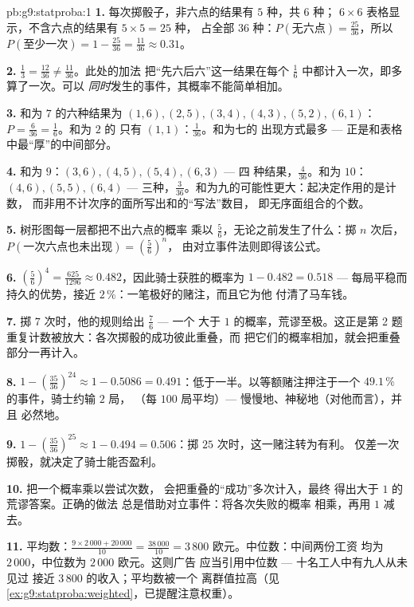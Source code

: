 \begin{solution}{pb:g9:statproba:1}
\textbf{1.} 每次掷骰子，非六点的结果有 $5$ 种，共 $6$ 种；
$6 \times 6$ 表格显示，不含六点的结果有 $5 \times 5 = 25$ 种，
占全部 $36$ 种：$P(\text{无六点}) = \frac{25}{36}$，所以
$P(\text{至少一次}) = 1 - \frac{25}{36} = \frac{11}{36}
\approx 0.31$。

\textbf{2.} $\frac13 = \frac{12}{36} \neq \frac{11}{36}$。此处的加法
把“先六后六”这一结果在每个
$\frac16$ 中都计入一次，即多算了一次。可以
\emph{同时}发生的事件，其概率不能简单相加。

\textbf{3.} 和为 $7$ 的六种结果为 $(1,6), (2,5), (3,4),
(4,3), (5,2), (6,1)$：$P = \frac{6}{36} = \frac16$。和为 $2$ 的
只有 $(1,1)$：$\frac{1}{36}$。和为七的
出现方式最多 --- 正是和表格中最“厚”的中间部分。

\textbf{4.} 和为 $9$：$(3,6), (4,5), (5,4), (6,3)$ --- 四
种结果，$\frac{4}{36}$。和为 $10$：$(4,6), (5,5), (6,4)$ ---
三种，$\frac{3}{36}$。和为九的可能性更大：起决定作用的是计数，
而非用不计次序的面所写出和的“写法”数目，
即无序面组合的个数。

\textbf{5.} 树形图每一层都把不出六点的概率
乘以 $\frac56$，无论之前发生了什么：掷 $n$
次后，$P(\text{一次六点也未出现}) = \left(\frac56\right)^n$，
由对立事件法则即得该公式。

\textbf{6.} $\left(\frac56\right)^4 = \frac{625}{1296} \approx
0.482$，因此骑士获胜的概率为
 $1 - 0.482 = 0.518$ --- 每局平稳而持久的优势，接近
 $2\,\%$：一笔极好的赌注，而且它为他
付清了马车钱。

\textbf{7.} 掷 $7$ 次时，他的规则给出 $\frac76$ --- 一个
大于 $1$ 的概率，荒谬至极。这正是第 2 题
重复计数被放大：各次掷骰的成功彼此重叠，而
把它们的概率相加，就会把重叠部分一再计入。

\textbf{8.} $1 - \left(\frac{35}{36}\right)^{24} \approx
1 - 0.5086 = 0.491$：低于一半。以等额赌注押注于一个
 $49.1\,\%$ 的事件，骑士约输 $2$ 局，
（每 $100$ 局平均）--- 慢慢地、神秘地（对他而言），并且
必然地。

\textbf{9.} $1 - \left(\frac{35}{36}\right)^{25} \approx
1 - 0.494 = 0.506$：掷 $25$ 次时，这一赌注转为有利。
仅差一次掷骰，就决定了骑士能否盈利。

\textbf{10.} 把一个概率乘以尝试次数，
会把重叠的“成功”多次计入，最终
得出大于 $1$ 的荒谬答案。正确的做法
总是借助对立事件：将各次失败的概率
相乘，再用 $1$ 减去。

\textbf{11.} 平均数：$\frac{9 \times 2\,000 + 20\,000}{10} =
\frac{38\,000}{10} = 3\,800$ 欧元。中位数：中间两份工资
均为 $2\,000$，中位数为 $2\,000$ 欧元。这则广告
应当引用中位数 --- 十名工人中有九人从未见过
接近 $3\,800$ 的收入；平均数被一个
离群值拉高（见\cref{ex:g9:statproba:weighted}，已提醒注意权重）。


\end{solution}
